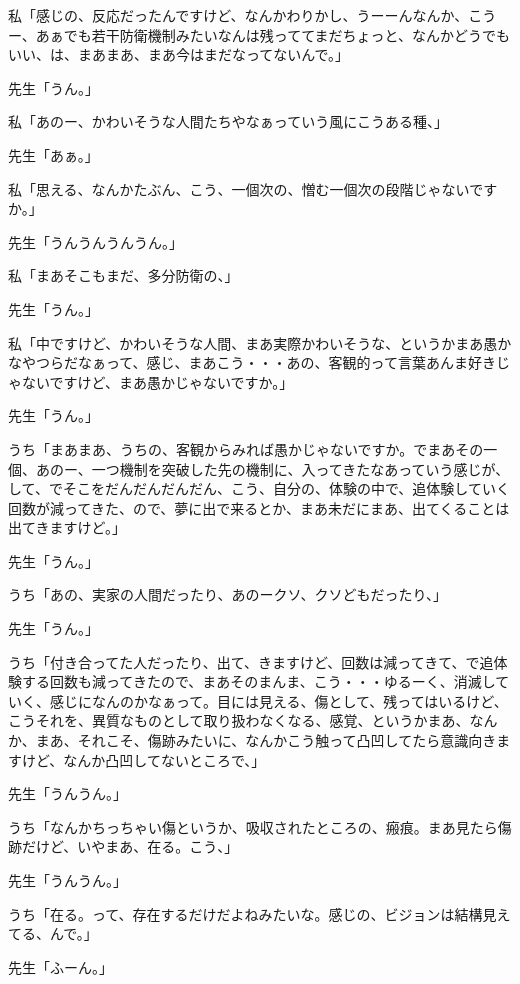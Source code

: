 \documentclass[b5j,twoside,twocolumn]{utarticle}
\begin{document}
\begin{description}
\item 私「感じの、反応だったんですけど、なんかわりかし、うーーんなんか、こうー、あぁでも若干防衛機制みたいなんは残っててまだちょっと、なんかどうでもいい、は、まあまあ、まあ今はまだなってないんで。」
\item 先生「うん。」
\item 私「あのー、かわいそうな人間たちやなぁっていう風にこうある種、」
\item 先生「あぁ。」
\item 私「思える、なんかたぶん、こう、一個次の、憎む一個次の段階じゃないですか。」
\item 先生「うんうんうんうん。」
\item 私「まあそこもまだ、多分防衛の、」
\item 先生「うん。」
\item 私「中ですけど、かわいそうな人間、まあ実際かわいそうな、というかまあ愚かなやつらだなぁって、感じ、まあこう・・・あの、客観的って言葉あんま好きじゃないですけど、まあ愚かじゃないですか。」
\item 先生「うん。」
\item うち「まあまあ、うちの、客観からみれば愚かじゃないですか。でまあその一個、あのー、一つ機制を突破した先の機制に、入ってきたなあっていう感じが、して、でそこをだんだんだんだん、こう、自分の、体験の中で、追体験していく回数が減ってきた、ので、夢に出で来るとか、まあ未だにまあ、出てくることは出てきますけど。」
\item 先生「うん。」
\item うち「あの、実家の人間だったり、あのークソ、クソどもだったり、」
\item 先生「うん。」
\item うち「付き合ってた人だったり、出て、きますけど、回数は減ってきて、で追体験する回数も減ってきたので、まあそのまんま、こう・・・ゆるーく、消滅していく、感じになんのかなぁって。目には見える、傷として、残ってはいるけど、こうそれを、異質なものとして取り扱わなくなる、感覚、というかまあ、なんか、まあ、それこそ、傷跡みたいに、なんかこう触って凸凹してたら意識向きますけど、なんか凸凹してないところで、」
\item 先生「うんうん。」
\item うち「なんかちっちゃい傷というか、吸収されたところの、瘢痕。まあ見たら傷跡だけど、いやまあ、在る。こう、」
\item 先生「うんうん。」
\item うち「在る。って、存在するだけだよねみたいな。感じの、ビジョンは結構見えてる、んで。」
\item 先生「ふーん。」

\end{description}
\end{document}
